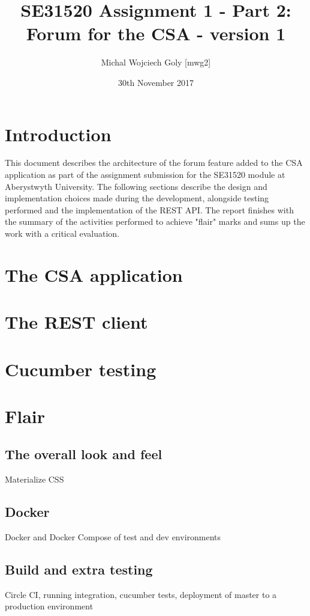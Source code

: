 \documentclass[a4paper, 11pt, titlepage]{article}
\title{SE31520 Assignment 1 - Part 2: Forum for the CSA - version 1}
\author{Michal Wojciech Goly [mwg2]}
\date{30th November 2017}
\begin{document}
\maketitle
\tableofcontents
\newpage

\section{Introduction}
This document describes the architecture of the forum feature added to the CSA application
as part of the assignment submission for the SE31520 module at Aberystwyth University. The
following sections describe the design and implementation choices made during the development,
alongside testing performed and the implementation of the REST API. The report finishes with
the summary of the activities performed to achieve "flair" marks and sums up the work with
a critical evaluation.

\section{The CSA application}


\section{The REST client}

\section{Cucumber testing}

\section{Flair}
\subsection{The overall look and feel}
Materialize CSS

\subsection{Docker}
Docker and Docker Compose of test and dev environments

\subsection{Build and extra testing}
Circle CI, running integration, cucumber tests, deployment of master to a production environment
\end{document}
